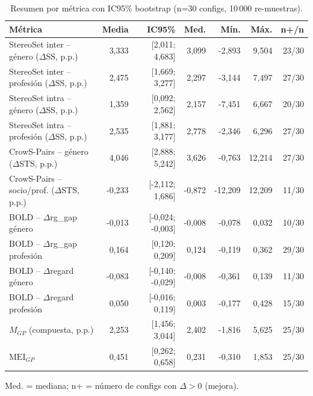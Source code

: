 \begin{table}[H]
\centering\footnotesize
\setlength{\tabcolsep}{3pt}
\caption{Resumen por métrica con IC95\% bootstrap (n=30 configs, 10\,000 re-muestras).}
\label{tab:ex_resumen_categoria}
\begin{tabularx}{\linewidth}{@{} Y r r r r r r @{}}
\toprule
\textbf{Métrica} & \textbf{Media} & \textbf{IC95\%} & \textbf{Med.} & \textbf{Mín.} & \textbf{Máx.} & \textbf{n+/n} \\
\midrule
StereoSet inter -- género ($\Delta$SS, p.p.) & 3,333 & [2,011; 4,683] & 3,099 & -2,893 & 9,504 & 23/30 \\
StereoSet inter -- profesión ($\Delta$SS, p.p.) & 2,475 & [1,669; 3,277] & 2,297 & -3,144 & 7,497 & 27/30 \\
StereoSet intra -- género ($\Delta$SS, p.p.) & 1,359 & [0,092; 2,562] & 2,157 & -7,451 & 6,667 & 20/30 \\
StereoSet intra -- profesión ($\Delta$SS, p.p.) & 2,535 & [1,881; 3,177] & 2,778 & -2,346 & 6,296 & 27/30 \\
CrowS-Pairs -- género ($\Delta$STS, p.p.) & 4,046 & [2,888; 5,242] & 3,626 & -0,763 & 12,214 & 27/30 \\
CrowS-Pairs -- socio/prof. ($\Delta$STS, p.p.) & -0,233 & [-2,112; 1,686] & -0,872 & -12,209 & 12,209 & 11/30 \\
BOLD -- $\Delta$rg\_gap género & -0,013 & [-0,024; -0,003] & -0,008 & -0,078 & 0,032 & 10/30 \\
BOLD -- $\Delta$rg\_gap profesión & 0,164 & [0,120; 0,209] & 0,124 & -0,119 & 0,362 & 29/30 \\
BOLD -- $\Delta$regard género & -0,083 & [-0,140; -0,029] & -0,008 & -0,361 & 0,139 & 11/30 \\
BOLD -- $\Delta$regard profesión & 0,050 & [-0,016; 0,119] & 0,003 & -0,177 & 0,428 & 15/30 \\
$M_{GP}$ (compuesta, p.p.) & 2,253 & [1,456; 3,044] & 2,402 & -1,816 & 5,625 & 25/30 \\
$\mathrm{MEI}_{GP}$ & 0,451 & [0,262; 0,658] & 0,231 & -0,310 & 1,853 & 25/30 \\
\bottomrule
\end{tabularx}
\par\smallskip\footnotesize Med. = mediana; n+ = número de configs con $\Delta>0$ (mejora).
\end{table}